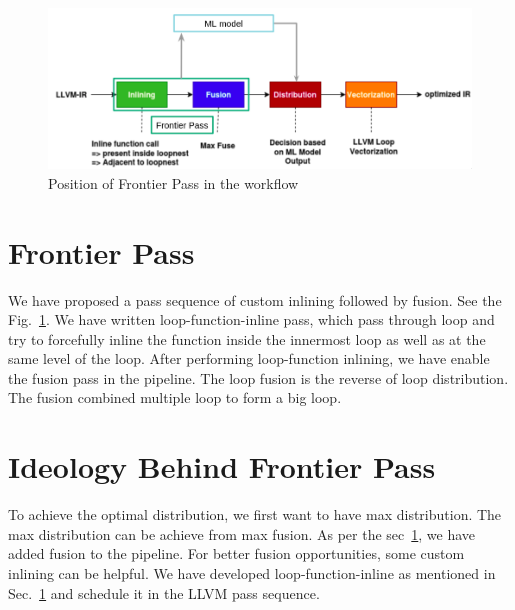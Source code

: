 \begin{figure}[t]
    \centering
    \includegraphics[scale=0.4]{figures/chapter-4/distribution_flow.png}
    \caption{Position of Frontier Pass in the workflow}
     \label{fig:dist-flow}
\end{figure}

\section{Frontier Pass}\label{sec:distribution:fp}
 We have proposed a pass sequence of custom inlining followed by fusion. See the Fig.~\ref{fig:dist-flow}. We have written loop-function-inline pass, which pass through loop and try to forcefully inline the function inside the innermost loop as well as at the same level of the loop. After performing loop-function inlining, we have enable the fusion pass in the pipeline. The loop fusion is the reverse of loop distribution. The fusion combined multiple loop to form a big loop. 
 



\section{Ideology Behind Frontier Pass}\label{sec:distribution:ideo}
To achieve the optimal distribution, we first want to have max distribution. The max distribution can be achieve from max fusion. As per the sec~\ref{sec:distribution:fp}, we have added fusion to the pipeline. For better fusion opportunities, some custom inlining can be helpful. We have developed loop-function-inline as mentioned in Sec.~\ref{sec:distribution:fp} and schedule it in the LLVM pass sequence. 

